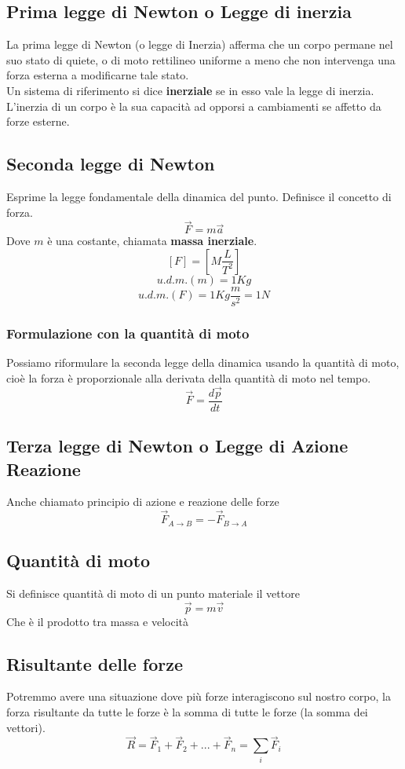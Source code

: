 \documentclass[a4paper]{report}
\begin{document}
  \subsection{Prima legge di Newton o Legge di inerzia}
  La prima legge di Newton (o legge di Inerzia) afferma che un corpo permane nel suo stato di quiete, o di moto rettilineo uniforme a meno che non intervenga una forza esterna a modificarne tale stato.\\
  Un sistema di riferimento si dice \textbf{inerziale} se in esso vale la legge di inerzia.
  L'inerzia di un corpo è la sua capacità ad opporsi a cambiamenti se affetto da forze esterne.

  \subsection{Seconda legge di Newton}
  Esprime la legge fondamentale della dinamica del punto. Definisce il concetto di forza.
  $$ \vec{F} = m\vec{a} $$
  Dove $m$ è una costante, chiamata \textbf{massa inerziale}.
  $$ [F] = [M \frac{L}{T^2}]$$
  $$ u.d.m.(m) = 1Kg$$
  $$ u.d.m.(F) = 1 Kg \frac{m}{s^2} = 1N$$
  \subsubsection{Formulazione con la quantità di moto}
  Possiamo riformulare la seconda legge della dinamica usando la quantità di moto, cioè la forza è proporzionale alla derivata della quantità di moto nel tempo.
  $$ \vec{F} = \frac{d\vec{p}}{dt}$$

  \subsection{Terza legge di Newton o Legge di Azione Reazione}
  Anche chiamato principio di azione e reazione delle forze
  $$ \vec{F}_{A \rightarrow B} = -\vec{F}_{B \rightarrow A} $$

  \subsection{Quantità di moto}
  Si definisce quantità di moto di un punto materiale il vettore
  $$ \vec{p} = m\vec{v} $$
  Che è il prodotto tra massa e velocità

  \subsection{Risultante delle forze}
  Potremmo avere una situazione dove più forze interagiscono sul nostro corpo, la forza risultante da tutte le forze è la somma di tutte le forze (la somma dei vettori).
  $$ \vec{R} = \vec{F}_1 + \vec{F}_2 + ... +\vec{F}_n = \sum_i \vec{F}_i $$
\end{document}
